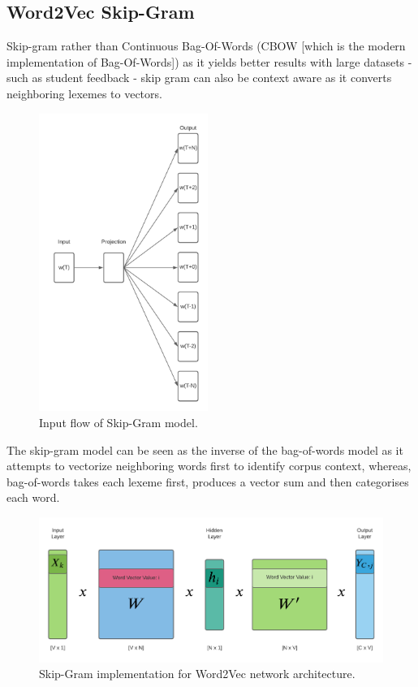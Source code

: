 \subsection{Word2Vec Skip-Gram}

Skip-gram rather than Continuous Bag-Of-Words (CBOW [which is the modern implementation of Bag-Of-Words]) as it yields better results with large datasets - such as student feedback - skip gram can also be context aware as it converts neighboring lexemes to vectors.

\begin{figure}[H]
    \centering
    \includegraphics[width=0.49\textwidth]{figures/chapter-5/SkipGramModel.pdf}
    \caption[SkipGramModel]{Input flow of Skip-Gram model.
    \label{fig:SkipGramModel}}
\end{figure}

The skip-gram model can be seen as the inverse of the bag-of-words model as it attempts to vectorize neighboring words first to identify corpus context, whereas, bag-of-words takes each lexeme first, produces a vector sum and then categorises each word.

\begin{figure}[H]
    \centering
    \includegraphics[width=\textwidth]{figures/chapter-5/SkipGramNetwork.pdf}
    \caption[SkipGramNetwork]{Skip-Gram implementation for Word2Vec network architecture.
    \label{fig:SkipGramNetwork}}
\end{figure}

